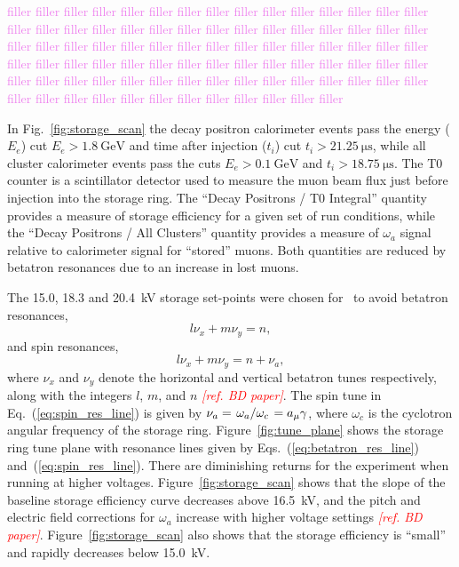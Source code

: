 \textcolor{violet}{filler filler filler filler filler filler filler filler filler filler filler filler filler filler filler filler filler filler filler filler filler filler filler filler filler filler filler filler filler filler filler filler filler filler filler filler filler filler filler filler filler filler filler filler filler filler filler filler filler filler filler filler filler filler filler filler filler filler filler filler filler filler filler filler filler filler filler filler filler filler filler filler filler filler filler filler filler filler filler filler filler filler filler filler filler filler filler}

In Fig.~\ref{fig:storage_scan} the decay positron calorimeter events pass the energy ($E_{e}$) cut $E_{e}>\SI{1.8}{\giga\eV}$ and time after injection ($t_{i}$) cut $t_{i}>\SI{21.25}{\micro\second}$, while all cluster calorimeter events pass the cuts $E_{e}>\SI{0.1}{\giga\eV}$ and $t_{i}>\SI{18.75}{\micro\second}$. The T0 counter is a scintillator detector used to measure the muon beam flux just before injection into the storage ring. The ``Decay Positrons / T0 Integral'' quantity provides a measure of storage efficiency for a given set of run conditions, while the ``Decay Positrons / All Clusters'' quantity provides a measure of $\omega_{a}$ signal relative to calorimeter signal for ``stored'' muons. Both quantities are reduced by betatron resonances due to an increase in lost muons.

The 15.0, 18.3 and \SI{20.4}{\kilo\volt} storage set-points were chosen for \runone~to avoid betatron resonances,
\begin{equation}
	l\nu_{x}+m\nu_{y}=n,
	\label{eq:betatron_res_line}
\end{equation}
and spin resonances,
\begin{equation}
	l\nu_{x}+m\nu_{y}=n+\nu_{a},
	\label{eq:spin_res_line}
\end{equation}
where $\nu_{x}$ and $\nu_{y}$ denote the horizontal and vertical betatron tunes respectively, along with the integers $l$, $m$, and $n$ \textcolor{red}{\textit{[ref. BD paper]}}. The spin tune in Eq.~(\ref{eq:spin_res_line}) is given by $\nu_{a}=\left.\omega_{a}\middle/\omega_{c}\right.=a_{\mu}\gamma$, where $\omega_{c}$ is the cyclotron angular frequency of the storage ring. Figure~\ref{fig:tune_plane} shows the storage ring tune plane with resonance lines given by Eqs.~(\ref{eq:betatron_res_line}) and~(\ref{eq:spin_res_line}). There are diminishing returns for the experiment when running at higher voltages. Figure~\ref{fig:storage_scan} shows that the slope of the baseline storage efficiency curve decreases above \SI{16.5}{\kilo\volt}, and the pitch and electric field corrections for $\omega_{a}$ increase with higher voltage settings \textcolor{red}{\textit{[ref. BD paper]}}. Figure~\ref{fig:storage_scan} also shows that the storage efficiency is ``small'' and rapidly decreases below \SI{15.0}{\kilo\volt}.

